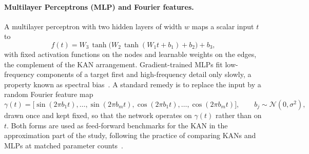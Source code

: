 {\JOY
\paragraph{Multilayer Perceptrons (MLP) and Fourier features.}
A multilayer perceptron with two hidden layers of width \(w\) maps a
scalar input \(t\) to
\begin{equation}
f(t)=W_3\,\tanh\!\bigl(W_2\,\tanh(W_1 t+b_1)+b_2\bigr)+b_3,
\label{eq:mlp}
\end{equation}
with fixed activation functions on the nodes and learnable weights on
the edges, the complement of the KAN arrangement. Gradient-trained MLPs
fit low-frequency components of a target first and high-frequency
detail only slowly, a property known as spectral
bias~\cite{rahaman2019spectral}. A standard remedy is to replace the
input by a random Fourier feature map~\cite{tancik2020fourier}
\begin{equation}
\gamma(t)=\bigl[\sin(2\pi b_1 t),\ldots,\sin(2\pi b_m t),
\cos(2\pi b_1 t),\ldots,\cos(2\pi b_m t)\bigr],\qquad
b_j\sim\mathcal{N}(0,\sigma^2),
\label{eq:fourier}
\end{equation}
drawn once and kept fixed, so that the network operates on
\(\gamma(t)\) rather than on \(t\). Both forms are used as feed-forward
benchmarks for the KAN in the approximation part of the study, following
the practice of comparing KANs and MLPs at matched parameter
counts~\cite{liu2024kan,yu2024kanmlp}.
}
